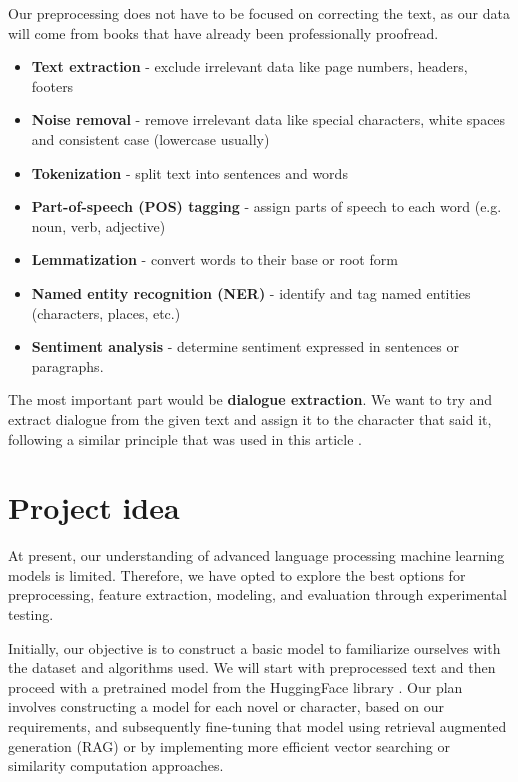 \documentclass[fleqn,moreauthors,10pt]{ds_report}
\begin{document}
Our preprocessing does not have to be focused on correcting the text, as our data will come from books that have already been professionally proofread. 

\begin{itemize}
    \item \textbf{Text extraction} - exclude irrelevant data like page numbers, headers, footers
    \item \textbf{Noise removal} - remove irrelevant data like special characters, white spaces and consistent case (lowercase usually)
    \item \textbf{Tokenization} - split text into sentences and words
    \item \textbf{Part-of-speech (POS) tagging} -  assign parts of speech to each word (e.g. noun, verb, adjective)
    \item \textbf{Lemmatization} - convert words to their base or root form
    \item \textbf{Named entity recognition (NER)} - identify and tag named entities (characters, places, etc.)
    \item \textbf{Sentiment analysis} - determine sentiment expressed in sentences or paragraphs. 
\end{itemize}

The most important part would be \textbf{dialogue extraction}. We want to try and extract dialogue from the given text and assign it to the character that said it, following a similar principle that was used in this article \cite{li2019follow}. 

\section*{Project idea}

At present, our understanding of advanced language processing machine learning models is limited. Therefore, we have opted to explore the best options for preprocessing, feature extraction, modeling, and evaluation through experimental testing.

Initially, our objective is to construct a basic model to familiarize ourselves with the dataset and algorithms used. We will start with preprocessed text and then proceed with a pretrained model from the HuggingFace library \cite{wolf2019huggingface}. Our plan involves constructing a model for each novel or character, based on our requirements, and subsequently fine-tuning that model using retrieval augmented generation (RAG) \cite{lewis2020retrieval, jiang2023active} or by implementing more efficient vector searching or similarity computation approaches.
\end{document}
